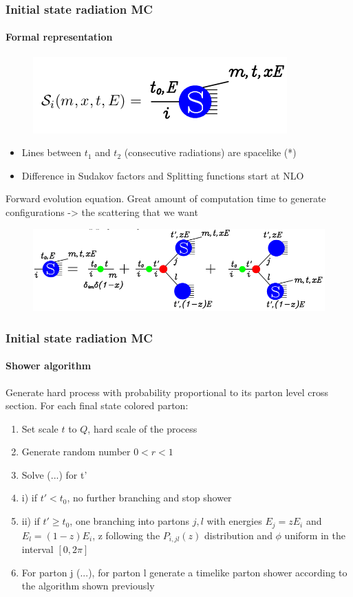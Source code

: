 \documentclass[aspectratio=43]{beamer}
\begin{document}
\begin{frame}
	
	\frametitle{Initial state radiation MC}
	\framesubtitle{Formal representation}
	
	\begin{figure}
		\includegraphics[width = 3 cm]{plots/shower_ISR_2.png}
	\end{figure}
	
	\begin{itemize} 
		\item Lines between $t_{1}$ and $t_{2}$ (consecutive radiations) are spacelike {\color{blue}(*)}
		\item Difference in Sudakov factors and Splitting functions start at NLO
	\end{itemize}
	
	Forward evolution equation. Great amount of computation time to generate configurations -> the scattering that we want
	\begin{figure}
		\includegraphics[width = 10 cm]{plots/shower_ISR_3.png}
	\end{figure}

\end{frame}

\begin{frame}

	\frametitle{Initial state radiation MC}
	\framesubtitle{Shower algorithm}
	
	Generate hard process with probability proportional to its parton level cross section. For each final state colored parton:
	\begin{enumerate} 
		\item Set scale $t$ to $Q$, hard scale of the process
		\item Generate random number $0 < r < 1$
		\item Solve (...) for t'
		\item i) if $t' < t_{0}$, no further branching and stop shower
		\item ii) if $t' \geq t_{0}$, one branching into partons $j, l$ with energies $E_{j} = zE_{i}$ and $E_{l} = (1 - z)E_{i}$, z following the $P_{i, jl}(z)$ distribution and $\phi$ uniform in the interval $[0, 2\pi]$
		\item For parton j (...), for parton l generate a timelike parton shower according to the algorithm shown previously
	\end{enumerate}

\end{frame}
\end{document}
